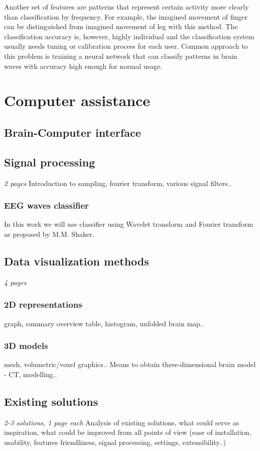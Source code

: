 Another set of features are patterns that represent certain activity more
clearly than classification by frequency. For example, the imagined movement of
finger can be distinguished from imagined movement of leg with this method. The
classification accuracy is, however, highly individual and the classification
system usually needs tuning or calibration process for each user.\cite{bcComm}
Common approach to this problem is training a neural network that can classify
patterns in brain waves with accuracy high enough for normal usage.

\chapter{Computer assistance}
\section{Brain-Computer interface} 
\section{Signal processing}
\label{sec:sigProc}
\emph{2 pages}
Introduction to sampling, fourier transform, various signal filters..
\subsection{EEG waves classifier}
In this work we will use classifier using Wavelet transform and Fourier
transform as proposed by M.M. Shaker. \cite{eegWaveFt} 
\section{Data visualization methods}
\emph{4 pages}
\subsection{2D representations}
graph, summary overview table, histogram, unfolded brain map..
\subsection{3D models}
mesh, volumetric/voxel graphics.. 
Means to obtain three-dimensional brain model - CT, modelling..
\section{Existing solutions}
\emph{2-3 solutions, 1 page each}
Analysis of existing solutions, what could serve as inspiration, what could be
improved from all points of view (ease of installation, usability, features
friendliness, signal processing, settings, extensibility..)

